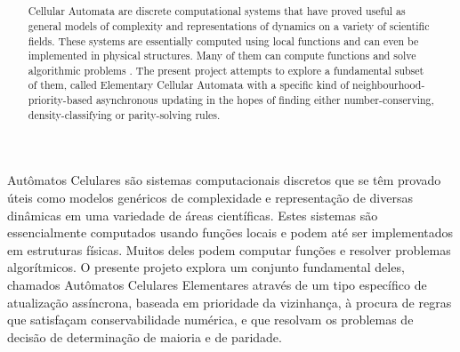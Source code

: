 \documentclass[a4paper,12pt]{ltxdoc}
\title{\protect\parbox{\textwidth}{\protect\centering \textbf{\titulo}}}
\date{}
\begin{document}
\newcommand{\titulo}{
  \large{\centerline{Três Experimentos com Atualização Assíncrona por Prioridade}}
  \large{\centerline{de Vizinhança em Autômatos Celulares Elementares}}
  \\~\\
  \normalfont{\normalsize{Marcelo Vironda Rozanti\\Felipe Stefanelli de Aguiar Silva\\Prof. Dr. Pedro Paulo Balbi de Oliveira\\Faculdade de Computação e Informática - Universidade Presbiteriana Mackenzie \\São Paulo, SP -- Brasil}}
}

\maketitle

\begin{abstract}
  Cellular Automata are discrete computational systems that have proved useful as general models of complexity and representations of dynamics on a variety of scientific fields. These systems are essentially computed using local functions and can even be implemented in physical structures. Many of them can compute functions and solve algorithmic problems . The present project attempts to explore a fundamental subset of them, called Elementary Cellular Automata with a specific kind of neighbourhood-priority-based asynchronous updating in the hopes of finding either number-conserving, density-classifying or parity-solving rules.
\end{abstract}

\begin{resumo}
  Autômatos Celulares são sistemas computacionais discretos que se têm provado úteis como modelos genéricos de complexidade e representação de diversas dinâmicas em uma variedade de áreas científicas. Estes sistemas são essencialmente computados usando funções locais e podem até ser implementados em estruturas físicas. Muitos deles podem computar funções e resolver problemas algorítmicos. O presente projeto explora um conjunto fundamental deles, chamados Autômatos Celulares Elementares através de um tipo específico de atualização assíncrona, baseada em prioridade da vizinhança, à procura de regras que satisfaçam conservabilidade numérica, e que resolvam os problemas de decisão de determinação de maioria e de paridade.

\end{resumo}
\end{document}
